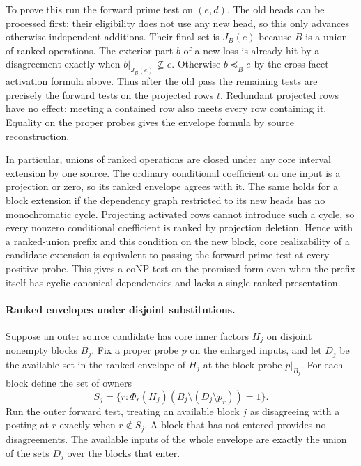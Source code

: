 To prove this run the forward prime test on $(e,d)$.
The old heads can be processed first: their eligibility
does not use any new head, so this only advances otherwise
independent additions. Their final set is $J_B(e)$
because $B$ is a union of ranked operations. The exterior
part $b$ of a new loss is already hit by a disagreement
exactly when $b|_{J_B(e)}\not\subseteq e$. Otherwise
$b\preceq_B e$ by the cross-facet activation formula
above. Thus after the old pass the remaining tests are
precisely the forward tests on the projected rows $t$.
Redundant projected rows have no effect: meeting a
contained row also meets every row containing it.
Equality on the proper probes gives the envelope formula
by source reconstruction.

In particular, unions of ranked operations are closed
under any core interval extension by one source. The
ordinary conditional coefficient on one input is a
projection or zero, so its ranked envelope agrees with it.
The same holds for a block extension if the dependency
graph restricted to its new heads has no monochromatic
cycle. Projecting activated rows cannot introduce such
a cycle, so every nonzero conditional coefficient is
ranked by projection deletion. Hence with a ranked-union
prefix and this condition on the new block, core
realizability of a candidate extension is equivalent
to passing the forward prime test at every positive
probe. This gives a coNP test on the promised form even
when the prefix itself has cyclic canonical dependencies
and lacks a single ranked presentation.

\paragraph{Ranked envelopes under disjoint substitutions.}
Suppose an outer source candidate has core inner factors $H_j$
on disjoint nonempty blocks $B_j$. Fix a proper probe $p$ on
the enlarged inputs, and let $D_j$ be the available set in the
ranked envelope of $H_j$ at the block probe $p|_{B_j}$.
For each block define the set of owners
\[
 S_j=\bigl\{r:\Phi_r(H_j)(B_j\setminus(D_j\setminus p_r))=1\bigr\}.
\]
Run the outer forward test, treating an available block $j$
as disagreeing with a posting at $r$ exactly when $r\notin S_j$.
A block that has not entered provides no disagreements.
The available inputs of the whole envelope are exactly the
union of the sets $D_j$ over the blocks that enter.

